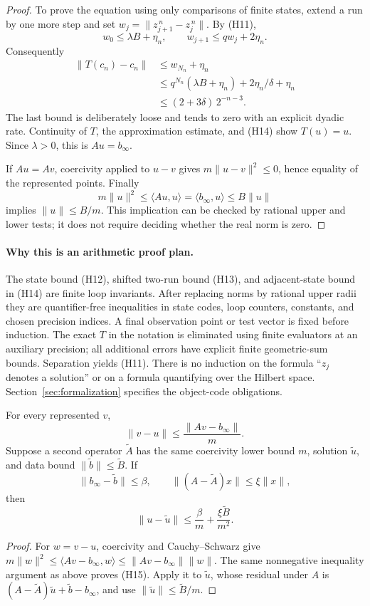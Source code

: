 \begin{proof}
To prove the equation using only comparisons of finite states, extend a run
by one more step and set \(w_j=\|z^{\,n}_{j+1}-z^{\,n}_j\|\).
By (H11),
\[
w_0\leq\lambda B+\eta_n,\qquad
w_{j+1}\leq q w_j+2\eta_n.
\]
Consequently
\[
\begin{split}
\|T(c_n)-c_n\|
 &\leq w_{N_n}+\eta_n\\
 &\leq q^{N_n}(\lambda B+\eta_n)+2\eta_n/\delta+\eta_n\\
 &\leq(2+3\delta)\,2^{-n-3}.
\end{split}
\tag{H14}
\]
The last bound is deliberately loose and tends to zero with an explicit
dyadic rate. Continuity of \(T\), the approximation estimate, and (H14)
show \(T(u)=u\). Since \(\lambda>0\), this is \(Au=b_\infty\).

If \(Au=Av\), coercivity applied to \(u-v\) gives
\(m\|u-v\|^2\leq0\), hence equality of the represented points.
Finally
\[
m\|u\|^2\leq\langle Au,u\rangle
 =\langle b_\infty,u\rangle\leq B\|u\|
\]
implies \(\|u\|\leq B/m\). This implication can be checked by rational upper
and lower tests; it does not require deciding whether the real norm is zero.
\end{proof}

\paragraph{Why this is an arithmetic proof plan.}
The state bound (H12), shifted two-run bound (H13), and adjacent-state bound
in (H14) are finite loop invariants. After replacing norms by rational upper
radii they are quantifier-free inequalities in state codes, loop counters,
constants, and chosen precision indices. A final observation point or test
vector is fixed before induction. The exact \(T\) in the notation is
eliminated using finite evaluators at an auxiliary precision; all additional
errors have explicit finite geometric-sum bounds. Separation yields (H11).
There is no induction on the formula ``\(z_j\) denotes a solution'' or on a
formula quantifying over the Hilbert space.
Section~\ref{sec:formalization} specifies the object-code obligations.

\begin{corollary}
\label{cor:residual}
For every represented \(v\),
\[
                   \|v-u\|\leq \frac{\|Av-b_\infty\|}{m}.
\tag{H15}
\]
Suppose a second operator \(\widetilde A\) has the same coercivity lower
bound \(m\), solution \(\widetilde u\), and data bound
\(\|\widetilde b\|\leq\widetilde B\). If
\[
\|b_\infty-\widetilde b\|\leq\beta,\qquad
\|(A-\widetilde A)x\|\leq\xi\|x\|,
\]
then
\[
       \|u-\widetilde u\|
       \leq \frac{\beta}{m}+\frac{\xi\widetilde B}{m^2}.
\tag{H16}
\]
\end{corollary}
\begin{proof}
For \(w=v-u\), coercivity and Cauchy--Schwarz give
\(m\|w\|^2\leq\langle Av-b_\infty,w\rangle
\leq\|Av-b_\infty\|\|w\|\).
The same nonnegative inequality argument as above proves (H15).
Apply it to \(\widetilde u\), whose residual under \(A\) is
\((A-\widetilde A)\widetilde u+\widetilde b-b_\infty\), and use
\(\|\widetilde u\|\leq\widetilde B/m\).
\end{proof}

